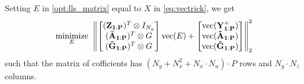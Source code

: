 \documentclass{article}
\begin{document}
Setting $E$ in \eqref{opt:lls_matrix} equal to $X$ in \eqref{eq:vectrick}, we get
\begin{align} \label{opt:lls_matrix}
    \underset{E}{\text{minimize}} \;\;  
    \norm{
        \begin{bmatrix}
            (\mathbf{Z_{1:P}})^T \otimes I_{N_y} \\
            (\mathbf{\bar{A}_{1:P}})^T \otimes G \\
            (\mathbf{\bar{G}_{1:P}})^T \otimes G \\
        \end{bmatrix}
        \text{vec}(E)
        +
        \begin{bmatrix}
            \text{vec}(\mathbf{Y^+_{1:P}}) \\
            \text{vec}(\mathbf{\tilde{A}_{1:P}}) \\
            \text{vec}(\mathbf{\tilde{G}_{1:P}})
        \end{bmatrix}
    }_2^2
\end{align}
such that the matrix of cofficients has $(N_y + N_x^2 + N_x \cdot N_u) \cdot P$ rows and 
$N_y \cdot N_z$ columns.

\end{document}
